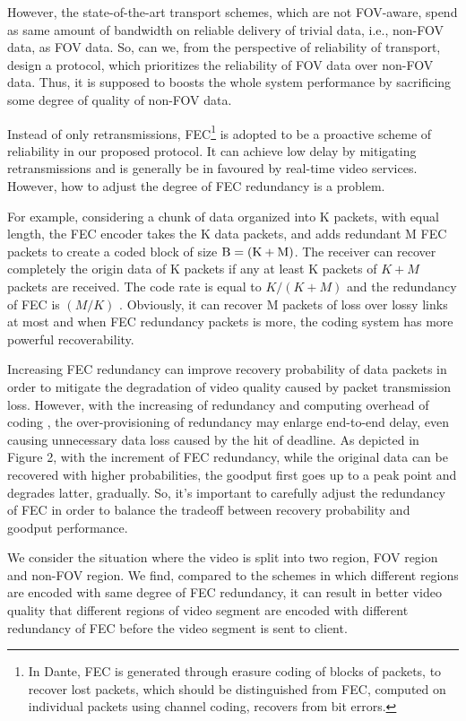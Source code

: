 	
	However, the state-of-the-art transport schemes, which are not FOV-aware, spend as same amount of bandwidth on reliable delivery of trivial data, i.e., non-FOV data, as FOV data. So, can we, from the perspective of reliability of transport, design a protocol, which prioritizes the reliability of FOV data over non-FOV data. Thus, it is supposed to boosts the whole system performance by sacrificing some degree of quality of non-FOV data.

	Instead of only retransmissions, FEC\footnote{In Dante, FEC is generated through erasure coding of blocks of packets, to recover lost packets, which should be distinguished from FEC, computed on individual packets using channel coding, recovers from bit errors.} is adopted to be a proactive scheme of reliability in our proposed protocol. It can achieve low delay by mitigating retransmissions and is generally be in favoured by real-time video services. However, how to adjust the degree of FEC redundancy is a problem. 
	 
	For example, considering a chunk of data organized into K packets, with equal length, the FEC encoder takes the K data packets, and adds redundant M FEC packets to create a coded block of size ${\rm{B = (K + M)}}$. The receiver can recover completely the origin data of K packets if any at least K packets of ${K + M}$ packets are received. The code rate is equal to ${K/(K + M)}$ and the redundancy of FEC is ${(M/K)}$ . Obviously, it can recover M packets of loss over lossy links at most and when FEC redundancy packets is more, the coding system has more powerful recoverability. 	 
	
	
    Increasing FEC redundancy can improve recovery probability of data packets in order to mitigate the degradation of video quality caused by packet transmission loss. However, with the increasing of redundancy and computing overhead of coding \cite{ASCOT}, the over-provisioning of redundancy may enlarge end-to-end delay, even causing unnecessary data loss caused by the hit of deadline. As depicted in Figure 2, with the increment of FEC redundancy, while the original data can be recovered with higher probabilities, the goodput first goes up to a peak point and degrades  latter, gradually. So, it's important to carefully adjust the redundancy of FEC in order to balance the tradeoff between recovery probability and goodput performance.  
	 
	We consider the situation where the video is split into two region, FOV region and non-FOV region. We find, compared to the schemes in which different regions are encoded with same degree of FEC redundancy, it can result in better video quality that different regions of video segment are encoded with different redundancy of FEC before the video segment is sent to client. 
	 
